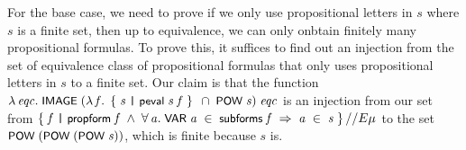 \documentclass[letterpaper]{article}
\renewcommand{\HOLConst}[1]{{\textsf{\upshape\small #1}}}
\renewcommand{\HOLinline}[1]{\ensuremath{#1}}
\begin{document}
For the base case, we need to prove if we only use propositional letters in $s$ where $s$ is a finite set, then up to equivalence, we can only onbtain finitely many propositional formulas. To prove this, it suffices to find out an injection from the set of equivalence class of propositional formulas that only uses propositional letters in $s$ to a finite set. Our claim is that the function 
\HOLinline{\HOLTokenLambda{}\HOLBoundVar{eqc}.\;\HOLConst{IMAGE}\;(\HOLTokenLambda{}\HOLBoundVar{f}.\;\HOLTokenLeftbrace{}\HOLBoundVar{s}\;\HOLTokenBar{}\;\HOLConst{peval}\;\HOLBoundVar{s}\;\HOLBoundVar{f}\HOLTokenRightbrace{}\;\HOLSymConst{\HOLTokenInter{}}\;\HOLConst{POW}\;\HOLFreeVar{s})\;\HOLBoundVar{eqc}} is an injection from our set from \HOLinline{\HOLTokenLeftbrace{}\HOLBoundVar{f}\;\HOLTokenBar{}\;\HOLConst{propform}\;\HOLBoundVar{f}\;\HOLSymConst{\HOLTokenConj{}}\;\HOLSymConst{\HOLTokenForall{}}\HOLBoundVar{a}.\;\HOLConst{VAR}\;\HOLBoundVar{a}\;\HOLSymConst{\HOLTokenIn{}}\;\HOLConst{subforms}\;\HOLBoundVar{f}\;\HOLSymConst{\HOLTokenImp{}}\;\HOLBoundVar{a}\;\HOLSymConst{\HOLTokenIn{}}\;\HOLFreeVar{s}\HOLTokenRightbrace{}\HOLSymConst{//E}\\
\HOLFreeVar{\ensuremath{\mu}}} to the set \HOLinline{\HOLConst{POW}\;(\HOLConst{POW}\;(\HOLConst{POW}\;\HOLFreeVar{s}))}, which is finite because $s$ is.

\end{document}
